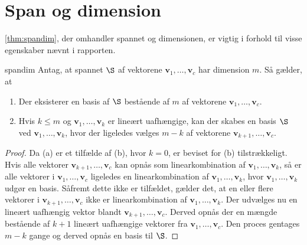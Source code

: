 \chapter{Span og dimension}
%
\ref{thm:spandim}, der omhandler spannet og dimensionen, er vigtig i forhold til visse egenskaber nævnt i rapporten.
%
\begin{thm}{}{spandim}
Antag, at spannet $\S$ af vektorene $\textbf{v}_1,\ldots,\textbf{v}_c$ har dimension $m$.
Så gælder, at
\begin{enumerate}[label=(\alph*)]
\item Der eksisterer en basis af $\S$ bestående af $m$ af vektorene $\mathbf{v}_1,\ldots,\mathbf{v}_c$.
\item Hvis $k\leq m$ og $\mathbf{v}_1,\ldots,\mathbf{v}_k$ er lineært uafhængige, kan der skabes en basis $\S$ ved $\mathbf{v}_1,\ldots,\mathbf{v}_k$, hvor der ligeledes vælges $m-k$ af vektorene $\mathbf{v}_{k+1},\ldots,\textbf{v}_c$.
\end{enumerate}
\end{thm}

\begin{proof}
Da (a) er et tilfælde af (b), hvor $k=0$, er beviset for (b) tilstrækkeligt.
Hvis alle vektorer $\mathbf{v}_{k+1},\ldots,\textbf{v}_c$ kan opnås som linearkombination af $\mathbf{v}_1,\ldots,\mathbf{v}_k$, så er alle vektorer i $\mathbf{v}_{1},\ldots,\textbf{v}_c$ ligeledes en linearkombination af $\mathbf{v}_1,\ldots,\mathbf{v}_k$, hvor $\mathbf{v}_1,\ldots,\mathbf{v}_k$ udgør en basis.
Såfremt dette ikke er tilfældet, gælder det, at en eller flere vektorer i $\mathbf{v}_{k+1},\ldots,\textbf{v}_c$ ikke er linearkombination af $\mathbf{v}_1,\ldots,\mathbf{v}_k$. 
Der udvælges nu en lineært uafhængig vektor blandt $\mathbf{v}_{k+1},\ldots,\textbf{v}_c$.
Derved opnås der en mængde bestående af $k+1$ lineært uafhængige vektorer fra $\mathbf{v}_{1},\ldots,\mathbf{v}_c$.
Den proces gentages $m-k$ gange og derved opnås en basis til $\S$.
\end{proof}
%